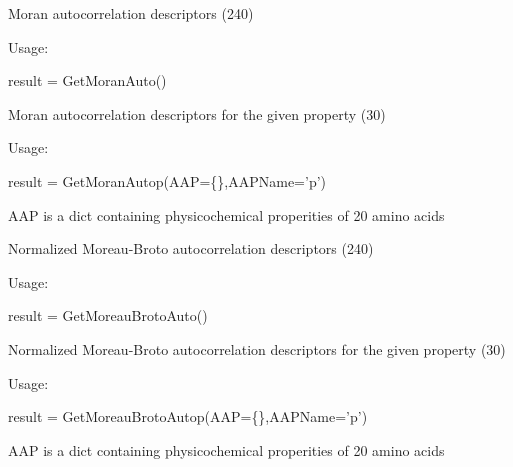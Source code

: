 \documentclass[letterpaper,10pt,english]{sphinxmanual}
\begin{document}
\begin{fulllineitems}
\begin{fulllineitems}
\label{reference/PyProteinclass:PyProtein.PyProtein.GetMoranAuto}
Moran autocorrelation descriptors (240)

Usage:

result = GetMoranAuto()

\end{fulllineitems}


\begin{fulllineitems}
\label{reference/PyProteinclass:PyProtein.PyProtein.GetMoranAutop}
Moran autocorrelation descriptors for the given property (30)

Usage:

result = GetMoranAutop(AAP=\{\},AAPName='p')

AAP is a dict containing physicochemical properities of 20 amino acids

\end{fulllineitems}


\begin{fulllineitems}
\label{reference/PyProteinclass:PyProtein.PyProtein.GetMoreauBrotoAuto}
Normalized Moreau-Broto autocorrelation descriptors (240)

Usage:

result = GetMoreauBrotoAuto()

\end{fulllineitems}


\begin{fulllineitems}
\label{reference/PyProteinclass:PyProtein.PyProtein.GetMoreauBrotoAutop}
Normalized Moreau-Broto autocorrelation descriptors for the given property (30)

Usage:

result = GetMoreauBrotoAutop(AAP=\{\},AAPName='p')

AAP is a dict containing physicochemical properities of 20 amino acids


\end{fulllineitems}
\end{fulllineitems}
\end{document}
